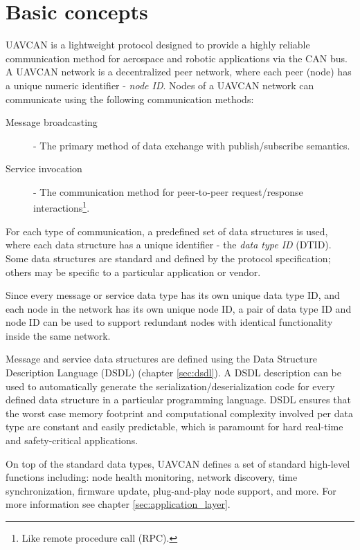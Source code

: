 \chapter{Basic concepts}\label{sec:basic_concepts}

UAVCAN is a lightweight protocol designed to provide a highly reliable communication method for
aerospace and robotic applications via the CAN bus.
A UAVCAN network is a decentralized peer network, where each peer (node) has a unique
numeric identifier - \emph{node ID}.
Nodes of a UAVCAN network can communicate using the following communication methods:
\begin{description}
    \item[Message broadcasting] - The primary method of data exchange with publish/subscribe semantics.
    \item[Service invocation] - The communication method for peer-to-peer request/response
    interactions\footnote{Like remote procedure call (RPC).}.
\end{description}

For each type of communication, a predefined set of data structures is used,
where each data structure has a unique identifier - the \emph{data type ID} (DTID).
Some data structures are standard and defined by the protocol specification;
others may be specific to a particular application or vendor.

Since every message or service data type has its own unique data type ID,
and each node in the network has its own unique node ID,
a pair of data type ID and node ID can be used to support redundant nodes with identical
functionality inside the same network.

Message and service data structures are defined using the Data Structure Description Language
(DSDL) (chapter \ref{sec:dsdl}).
A DSDL description can be used to automatically generate the serialization/deserialization code
for every defined data structure in a particular programming language.
DSDL ensures that the worst case memory footprint and computational complexity involved per data type
are constant and easily predictable, which is paramount for hard real-time and safety-critical applications.

On top of the standard data types, UAVCAN defines a set of standard high-level functions including:
node health monitoring, network discovery, time synchronization, firmware update,
plug-and-play node support, and more.
For more information see chapter \ref{sec:application_layer}.


